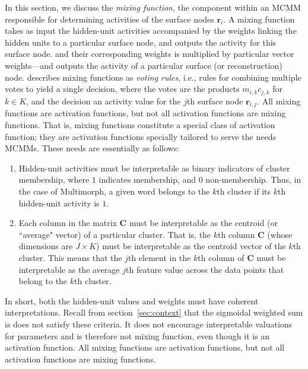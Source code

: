 In this section, we discuss the \emph{mixing function}, 
the component within an MCMM responsible for determining 
activities of the surface nodes $\textbf{r}_i$.
A mixing function takes as input the hidden-unit activities accompanied by the weights 
linking the hidden units to a particular surface node, and outputs the activity 
for this surface node. and their corresponding weights is  multiplied by 
particular vector weights---and outputs the activity of a particular surface 
(or reconstruction) node. \citet{saund:94} describes mixing functions as
\emph{voting rules}, i.e., rules for combining multiple votes to yield a single decision, 
where the votes are the products $m_{i,k}c_{j,k}$ for $k \in K$, and the decision an 
activity value for the $j$th surface node $\textbf{r}_{i,j}$. All mixing functions
are activation functions, but not all activation functions are mixing functions.
That is, mixing functions constitute a special class of activation function; they are 
activation functions specially tailored to serve the needs MCMMs. 
These needs are essentially as follows:
\begin{enumerate}
\item Hidden-unit activities 
must be interpretable as binary indicators of cluster membership, where $1$ 
indicates membership, and $0$ non-membership. Thus, in the case of 
Multimorph, a given word belongs to the 
$k$th cluster if its $k$th hidden-unit activity is $1$.
\item Each column in the matrix $\textbf{C}$ must be interpretable as the centroid 
(or ``average" vector) of a particular cluster. That is, the $k$th column 
$\textbf{C}$ (whose dimensions are $J \times K$) must be interpretable as the centroid vector of the $k$th cluster. This means that the $j$th element in the $k$th column of $\textbf{C}$ must be interpretable as the average $j$th feature value across the data points that belong to the $k$th cluster. 
\end{enumerate}
In short, both the hidden-unit values and weights must have coherent interpretations. 
Recall from section~\ref{sec:context} that the sigmoidal weighted sum is 
 does not satisfy these criteria. It does not encourage 
interpretable valuations for parameters and is therefore 
not mixing function, even though it is an activation function.  All mixing functions
are activation functions, but not all activation functions are mixing functions.

